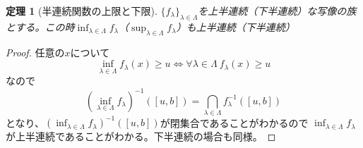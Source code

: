 \documentclass{jsarticle}
\newtheorem{theorem}{定理}
\begin{document}
\begin{theorem}[半連続関数の上限と下限]
$\{f_{\lambda}\}_{\lambda\in \Lambda}$を上半連続（下半連続）な写像の族とする。この時$\inf_{\lambda\in \Lambda}f_{\lambda}$（$\sup_{\lambda\in \Lambda}f_{\lambda}$）も上半連続（下半連続）
\end{theorem}
\begin{proof}任意の$x$について
\[
\inf_{\lambda\in \Lambda}f_{\lambda}(x)\ge u \Leftrightarrow \forall \lambda \in \Lambda\ f_{\lambda}(x)\ge u
\]なので
\[
(\inf_{\lambda\in \Lambda}f_{\lambda})^{-1}([u, b])=\bigcap_{\lambda\in \Lambda}f_{\lambda}^{-1}([u,b])
\]となり、$(\inf_{\lambda\in \Lambda}f_{\lambda})^{-1}([u, b])$が閉集合であることがわかるので
$\displaystyle{\inf_{\lambda\in \Lambda}f_{\lambda}}$が上半連続であることがわかる。下半連続の場合も同様。
\end{proof}
\end{document}
